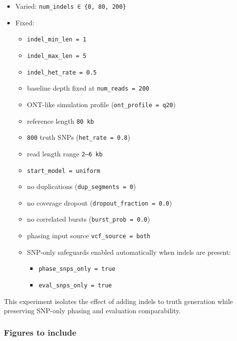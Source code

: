 \documentclass[
]{article}
\providecommand{\tightlist}{%
  \setlength{\itemsep}{0pt}\setlength{\parskip}{0pt}}
\begin{document}
\begin{itemize}
\tightlist
\item
  Varied: \texttt{num\_indels\ ∈\ \{0,\ 80,\ 200\}}
\item
  Fixed:

  \begin{itemize}
  \tightlist
  \item
    \texttt{indel\_min\_len\ =\ 1}
  \item
    \texttt{indel\_max\_len\ =\ 5}
  \item
    \texttt{indel\_het\_rate\ =\ 0.5}
  \item
    baseline depth fixed at \texttt{num\_reads\ =\ 200}
  \item
    ONT-like simulation profile (\texttt{ont\_profile\ =\ q20})
  \item
    reference length \texttt{80\ kb}
  \item
    \texttt{800} truth SNPs (\texttt{het\_rate\ =\ 0.8})
  \item
    read length range \texttt{2–6\ kb}
  \item
    \texttt{start\_model\ =\ uniform}
  \item
    no duplications (\texttt{dup\_segments\ =\ 0})
  \item
    no coverage dropout (\texttt{dropout\_fraction\ =\ 0.0})
  \item
    no correlated bursts (\texttt{burst\_prob\ =\ 0.0})
  \item
    phasing input source \texttt{vcf\_source\ =\ both}
  \item
    SNP-only safeguards enabled automatically when indels are present:

    \begin{itemize}
    \tightlist
    \item
      \texttt{phase\_snps\_only\ =\ true}
    \item
      \texttt{eval\_snps\_only\ =\ true}
    \end{itemize}
  \end{itemize}
\end{itemize}

This experiment isolates the effect of adding indels to truth generation
while preserving SNP-only phasing and evaluation comparability.

\subsubsection{Figures to include}\label{figures-to-include-5}
\end{document}
